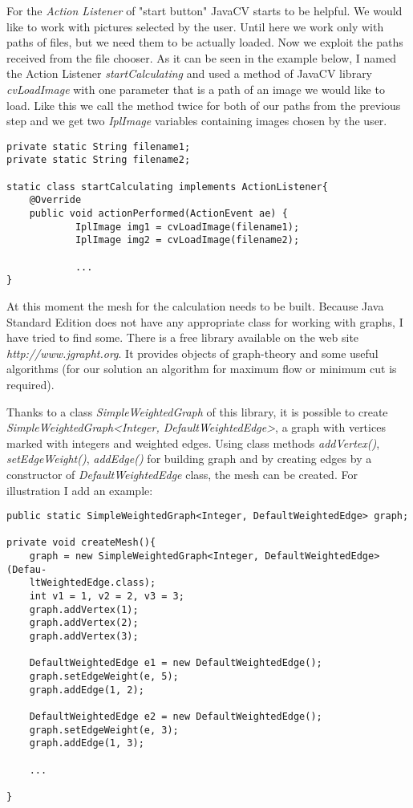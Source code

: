 \documentclass[12pt]{article}
\begin{document}
	For the {\itshape Action Listener} of "start button" JavaCV starts to be helpful. We would like to work with pictures selected by the user. Until here we work only with paths of files, but we need them to be actually loaded. Now we exploit the paths received from the file chooser. As it can be seen in the example below, I named the Action Listener {\itshape startCalculating} and used a method of JavaCV library {\itshape cvLoadImage} with one parameter that is a path of an image we would like to load. Like this we call the method twice for both of our paths from the previous step and we get two {\itshape IplImage} variables containing images chosen by the user.

	\begin{verbatim}
private static String filename1;
private static String filename2;

static class startCalculating implements ActionListener{
	@Override
	public void actionPerformed(ActionEvent ae) {
    		IplImage img1 = cvLoadImage(filename1);
    		IplImage img2 = cvLoadImage(filename2);	
    		
    		...
}
	\end{verbatim}
	
	At this moment the mesh for the calculation needs to be built. Because Java Standard Edition does not have any appropriate class for working with graphs, I have tried to find some. There is a free library available on the web site {\itshape http://www.jgrapht.org}. It provides objects of graph-theory and some useful algorithms (for our solution an algorithm for maximum flow or minimum cut is required).
	
	Thanks to a class {\itshape SimpleWeightedGraph} of this library, it is possible to create {\itshape SimpleWeightedGraph\textless Integer, DefaultWeightedEdge\textgreater}, a graph with vertices marked with integers and weighted edges. Using class methods {\itshape addVertex()}, {\itshape setEdgeWeight()}, {\itshape addEdge()} for building graph and by creating edges by a constructor of {\itshape DefaultWeightedEdge} class, the mesh can be created. For illustration I add an example:
	
	\begin{verbatim}
public static SimpleWeightedGraph<Integer, DefaultWeightedEdge> graph;

private void createMesh(){
	graph = new SimpleWeightedGraph<Integer, DefaultWeightedEdge>(Defau-
	ltWeightedEdge.class);	
	int v1 = 1, v2 = 2, v3 = 3;
	graph.addVertex(1);
	graph.addVertex(2);
	graph.addVertex(3);
	
	DefaultWeightedEdge e1 = new DefaultWeightedEdge();
	graph.setEdgeWeight(e, 5);
	graph.addEdge(1, 2);

	DefaultWeightedEdge e2 = new DefaultWeightedEdge();
	graph.setEdgeWeight(e, 3);
	graph.addEdge(1, 3);
	
	...

}
	\end{verbatim}
	  
\end{document}

